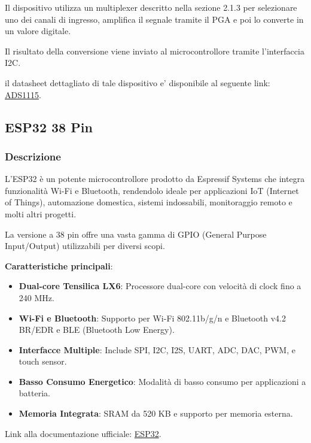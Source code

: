 \documentclass[12pt,a4paper]{report}
\begin{document}
Il dispositivo utilizza un multiplexer descritto nella sezione  2.1.3  per selezionare uno dei canali di ingresso, amplifica il segnale tramite il PGA e poi lo converte in un valore digitale. 

Il risultato della conversione viene inviato al microcontrollore tramite l'interfaccia I2C.

il datasheet dettagliato di tale dispositivo e' disponibile al seguente link: \href{https://www.ti.com/lit/ds/symlink/ads1115.pdf}{ADS1115}.


\newpage
\subsection{ESP32 38 Pin}
\subsubsection{Descrizione}
L'ESP32 è un potente microcontrollore prodotto da Espressif Systems che integra funzionalità Wi-Fi e Bluetooth, rendendolo ideale per applicazioni IoT (Internet of Things), automazione domestica, sistemi indossabili, monitoraggio remoto e molti altri progetti. 

La versione a 38 pin offre una vasta gamma di GPIO (General Purpose Input/Output) utilizzabili per diversi scopi.

\textbf{Caratteristiche principali}:
\begin{itemize}
    \item \textbf{Dual-core Tensilica LX6}: Processore dual-core con velocità di clock fino a 240 MHz.
    \item \textbf{Wi-Fi e Bluetooth}: Supporto per Wi-Fi 802.11b/g/n e Bluetooth v4.2 BR/EDR e BLE (Bluetooth Low Energy).
    \item \textbf{Interfacce Multiple}: Include SPI, I2C, I2S, UART, ADC, DAC, PWM, e touch sensor.
    \item \textbf{Basso Consumo Energetico}: Modalità di basso consumo per applicazioni a batteria.
    \item \textbf{Memoria Integrata}: SRAM da 520 KB e supporto per memoria esterna.
\end{itemize}

Link alla documentazione ufficiale: \href{https://www.espressif.com/sites/default/files/documentation/esp32-wroom-32_datasheet_en.pdf}{ESP32}.
\end{document}
